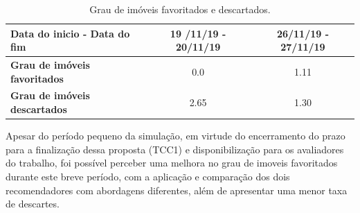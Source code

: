 \begin{table}[H]
\centering
\caption[Grau de imóveis favoritados e descartados]{Grau de imóveis favoritados e descartados.}
\begin{tabular}{lcc}
\hline
\textbf{Data do inicio - Data do fim} & 19 /11/19 - 20/11/19 & 26/11/19 - 27/11/19 \\ \hline
\textbf{Grau de imóveis favoritados} & 0.0 & 1.11 \\ \hline
\textbf{Grau de imóveis descartados} & 2.65 & 1.30 \\ \hline
\end{tabular}
\label{tab:my-table2}
\end{table}

Apesar do período pequeno da simulação, em virtude do encerramento do prazo para a finalização dessa proposta (TCC1) e disponibilização para os avaliadores do trabalho, foi possível perceber uma melhora no grau de imoveis favoritados durante este breve período, com a aplicação e comparação dos dois recomendadores com abordagens diferentes, além de apresentar uma menor taxa de descartes.